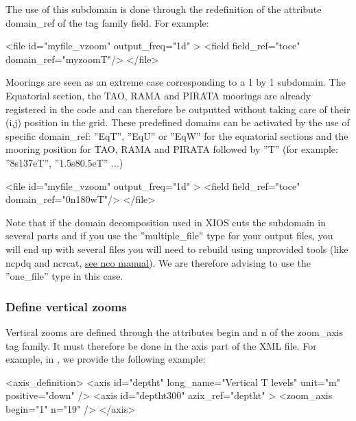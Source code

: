\documentclass[../main/NEMO_manual]{subfiles}
\begin{document}
The use of this subdomain is done through the redefinition of the attribute domain\_ref of the tag family field.
For example:

\begin{xmllines}
<file id="myfile_vzoom" output_freq="1d" >
   <field field_ref="toce" domain_ref="myzoomT"/>
</file>
\end{xmllines}

\noindent Moorings are seen as an extreme case corresponding to a 1 by 1 subdomain.
The Equatorial section, the TAO, RAMA and PIRATA moorings are already registered in the code and
can therefore be outputted without taking care of their (i,j) position in the grid.
These predefined domains can be activated by the use of specific domain\_ref:
''EqT'', ''EqU'' or ''EqW'' for the equatorial sections and
the mooring position for TAO, RAMA and PIRATA followed by ''T'' (for example: ''8s137eT'', ''1.5s80.5eT'' ...)

\begin{xmllines}
<file id="myfile_vzoom" output_freq="1d" >
   <field field_ref="toce" domain_ref="0n180wT"/>
</file>
\end{xmllines}

\noindent Note that if the domain decomposition used in XIOS cuts the subdomain in several parts and if
you use the ''multiple\_file'' type for your output files,
you will end up with several files you will need to rebuild using unprovided tools (like ncpdq and ncrcat,
\href{http://nco.sourceforge.net/nco.html#Concatenation}{see nco manual}).
We are therefore advising to use the ''one\_file'' type in this case.

\subsubsection{Define vertical zooms}

Vertical zooms are defined through the attributes begin and n of the zoom\_axis tag family.
It must therefore be done in the axis part of the XML file.
For example, in , we provide the following example:

\begin{xmllines}
<axis_definition>
   <axis id="deptht" long_name="Vertical T levels" unit="m" positive="down" />
   <axis id="deptht300" azix_ref="deptht" >
     <zoom_axis begin="1" n="19" />
</axis>
\end{xmllines}
\end{document}
